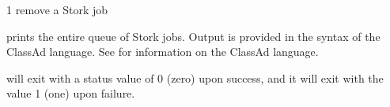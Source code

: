 \begin{ManPage}{\label{man-stork-q}}{1}
{remove a Stork job}
\Synopsis {}
\ToolArgsBase

\Storkname



\Description 

 prints the entire queue of Stork jobs.
Output is provided in the syntax of the ClassAd language.
See  for information
on the ClassAd language.


\begin{Options}
	\ToolArgsBaseDesc
	\StorknameDesc
\end{Options}

\ExitStatus

 will exit with a status value of 0 (zero) upon success,
and it will exit with the value 1 (one) upon failure.

\end{ManPage}
